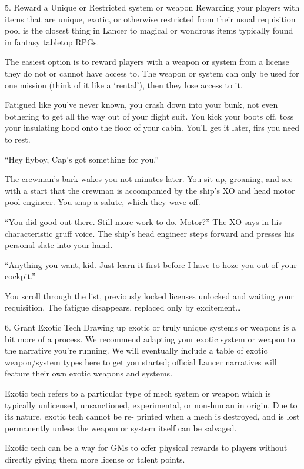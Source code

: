 5. Reward a Unique or Restricted system or weapon
Rewarding your players with items that are unique, exotic, or otherwise restricted from their usual
requisition pool is the closest thing in Lancer to magical or wondrous items typically found in
fantasy tabletop RPGs.


The easiest option is to reward players with a weapon or system from a license they do not
or cannot have access to. The weapon or system can only be used for one mission (think of it
like a ‘rental’), then they lose access to it.


Fatigued like you’ve never known, you crash down into your bunk, not even bothering to get all
the way out of your flight suit. You kick your boots off, toss your insulating hood onto the floor of
your cabin. You’ll get it later, firs you need to rest.

“Hey flyboy, Cap’s got something for you.”

The crewman’s bark wakes you not minutes later. You sit up, groaning, and see with a start that
the crewman is accompanied by the ship’s XO and head motor pool engineer. You snap a salute,
which they wave off.

“You did good out there. Still more work to do. Motor?” The XO says in his characteristic gruff
voice. The ship’s head engineer steps forward and presses his personal slate into your hand.

“Anything you want, kid. Just learn it first before I have to hoze you out of your cockpit.”




You scroll through the list, previously locked licenses unlocked and waiting your requisition. The
fatigue disappears, replaced only by excitement…

6. Grant Exotic Tech
Drawing up exotic or truly unique systems or weapons is a bit more of a process. We
recommend adapting your exotic system or weapon to the narrative you’re running. We will
eventually include a table of exotic weapon/system types here to get you started; official Lancer
narratives will feature their own exotic weapons and systems.


Exotic tech refers to a particular type of mech system or weapon which is typically unlicensed,
unsanctioned, experimental, or non-human in origin. Due to its nature, exotic tech cannot be re-
printed when a mech is destroyed, and is lost permanently unless the weapon or system itself
can be salvaged.


Exotic tech can be a way for GMs to offer physical rewards to players without directly giving
them more license or talent points.


